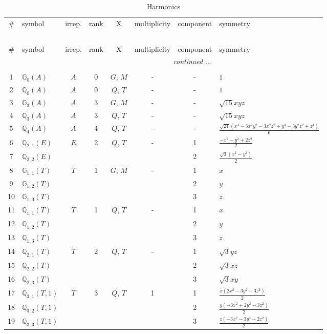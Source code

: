 \documentclass[fleqn,10pt,landscape]{jsarticle}
\begin{document}
\renewcommand{\arraystretch}{1.6}
\begin{longtable}[l]{clcccccl}
\captionsetup{justification=raggedright, singlelinecheck=off}
\caption{Harmonics}
 \\
 \hline \hline
\# & symbol & irrep. & rank & X & multiplicity & component & symmetry \\ \hline \endfirsthead

\multicolumn{7}{l}{\tablename\ \thetable{}} \\
 \hline \hline
\# & symbol & irrep. & rank & X & multiplicity & component & symmetry \\ \hline \endhead

 \hline \hline
\multicolumn{7}{r}{\footnotesize\it continued ...} \\ \endfoot

 \hline \hline
\multicolumn{7}{r}{} \\ \endlastfoot

1 & $\mathbb{G}_{0}(A)$ & $A$ & 0 & $G$, $M$ & - & - & $1$ \\ \hline
2 & $\mathbb{Q}_{0}(A)$ & $A$ & 0 & $Q$, $T$ & - & - & $1$ \\ \hline
3 & $\mathbb{G}_{3}(A)$ & $A$ & 3 & $G$, $M$ & - & - & $\sqrt{15} x y z$ \\ \hline
4 & $\mathbb{Q}_{3}(A)$ & $A$ & 3 & $Q$, $T$ & - & - & $\sqrt{15} x y z$ \\ \hline
5 & $\mathbb{Q}_{4}(A)$ & $A$ & 4 & $Q$, $T$ & - & - & $\frac{\sqrt{21} \left(x^{4} - 3 x^{2} y^{2} - 3 x^{2} z^{2} + y^{4} - 3 y^{2} z^{2} + z^{4}\right)}{6}$ \\ \hline
6 & $\mathbb{Q}_{2,1}(E)$ & $E$ & 2 & $Q$, $T$ & - & 1 & $\frac{- x^{2} - y^{2} + 2 z^{2}}{2}$ \\
7 & $\mathbb{Q}_{2,2}(E)$ &  &  &  &  & 2 & $\frac{\sqrt{3} \left(x^{2} - y^{2}\right)}{2}$ \\ \hline
8 & $\mathbb{G}_{1,1}(T)$ & $T$ & 1 & $G$, $M$ & - & 1 & $x$ \\
9 & $\mathbb{G}_{1,2}(T)$ &  &  &  &  & 2 & $y$ \\
10 & $\mathbb{G}_{1,3}(T)$ &  &  &  &  & 3 & $z$ \\ \hline
11 & $\mathbb{Q}_{1,1}(T)$ & $T$ & 1 & $Q$, $T$ & - & 1 & $x$ \\
12 & $\mathbb{Q}_{1,2}(T)$ &  &  &  &  & 2 & $y$ \\
13 & $\mathbb{Q}_{1,3}(T)$ &  &  &  &  & 3 & $z$ \\ \hline
14 & $\mathbb{Q}_{2,1}(T)$ & $T$ & 2 & $Q$, $T$ & - & 1 & $\sqrt{3} y z$ \\
15 & $\mathbb{Q}_{2,2}(T)$ &  &  &  &  & 2 & $\sqrt{3} x z$ \\
16 & $\mathbb{Q}_{2,3}(T)$ &  &  &  &  & 3 & $\sqrt{3} x y$ \\ \hline
17 & $\mathbb{Q}_{3,1}(T,1)$ & $T$ & 3 & $Q$, $T$ & 1 & 1 & $\frac{x \left(2 x^{2} - 3 y^{2} - 3 z^{2}\right)}{2}$ \\
18 & $\mathbb{Q}_{3,2}(T,1)$ &  &  &  &  & 2 & $\frac{y \left(- 3 x^{2} + 2 y^{2} - 3 z^{2}\right)}{2}$ \\
19 & $\mathbb{Q}_{3,3}(T,1)$ &  &  &  &  & 3 & $\frac{z \left(- 3 x^{2} - 3 y^{2} + 2 z^{2}\right)}{2}$ \\
\end{longtable}
\end{document}
